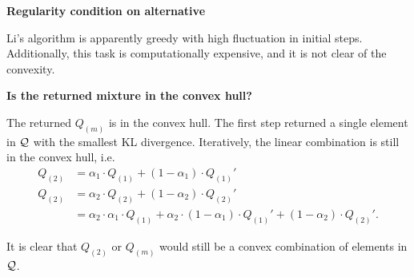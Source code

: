 \textbf{Regularity condition on alternative}

Li's algorithm is apparently greedy with high fluctuation in initial steps.
Additionally, this task is computationally expensive, and it is not clear of the convexity.

\textbf{Is the returned mixture in the convex hull?}

The returned $Q_{(m)}$ is in the convex hull.
The first step returned a single element in $\mathcal{Q}$ with the smallest KL divergence.
Iteratively, the linear combination is still in the convex hull, i.e.
\begin{align*}
	Q_{(2)} & = \alpha_1 \cdot Q_{(1)} + (1 - \alpha_1)\cdot Q_{(1)}' \\
	Q_{(2)} & = \alpha_2 \cdot Q_{(2)} + (1 - \alpha_2)\cdot Q_{(2)}' \\
	        & = \alpha_2 \cdot \alpha_1 \cdot Q_{(1)} +
	\alpha_2 \cdot (1 - \alpha_1) \cdot Q_{(1)}' +
	(1 - \alpha_2)\cdot Q_{(2)}'.
\end{align*}

It is clear that $Q_{(2)}$ or $Q_{(m)}$ would still be a convex combination of elements in $\mathcal{Q}$.


